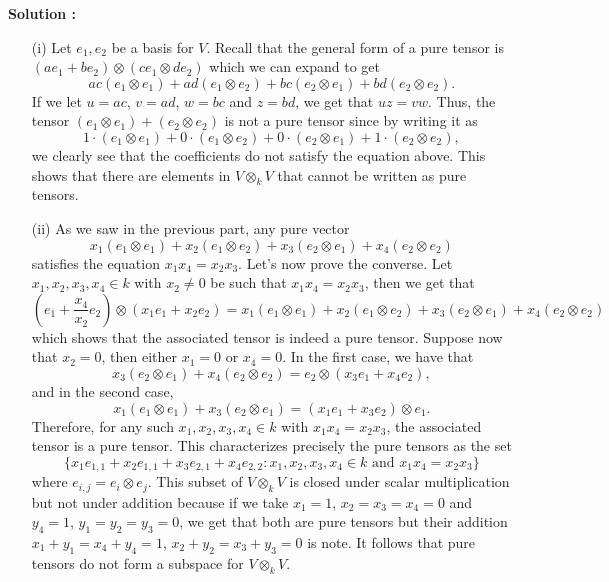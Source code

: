 \documentclass{article}
\begin{document}
\noindent \textbf{Solution :}
\begin{enumerate}
    \item[(i)] Let $e_1, e_2$ be a basis for $V$. Recall that the general form of a pure tensor is $(ae_1 + be_2)\otimes (ce_1 \otimes de_2)$ which we can expand to get
    $$ac (e_1 \otimes e_1) + ad(e_1 \otimes e_2) + bc(e_2 \otimes e_1) + bd(e_2 \otimes e_2).$$ 
    If we let $u = ac$, $v = ad$, $w = bc$ and $z = bd$, we get that $uz = vw$. Thus, the tensor $(e_1 \otimes e_1) + (e_2 \otimes e_2)$ is not a pure tensor since by writing it as
    $$1\cdot (e_1 \otimes e_1) + 0\cdot(e_1 \otimes e_2) + 0 \cdot (e_2 \otimes e_1) + 1 \cdot (e_2 \otimes e_2),$$
    we clearly see that the coefficients do not satisfy the equation above. This shows that there are elements in $V \otimes_k V$ that cannot be written as pure tensors.
    \item[(ii)] As we saw in the previous part, any pure vector
    $$x_1 (e_1 \otimes e_1) + x_2(e_1 \otimes e_2) + x_3 (e_2 \otimes e_1) + x_4 (e_2 \otimes e_2)$$
    satisfies the equation $x_1x_4 = x_2 x_3$. Let's now prove the converse. Let $x_1, x_2, x_3, x_4 \in k$ with $x_2 \neq 0$ be such that $x_1x_4 = x_2 x_3$, then we get that
    $$\left(e_1 + \frac{x_4}{x_2}e_2\right) \otimes (x_1e_1 + x_2 e_2) = x_1 (e_1 \otimes e_1) + x_2(e_1 \otimes e_2) + x_3 (e_2 \otimes e_1) + x_4 (e_2 \otimes e_2)$$
    which shows that the associated tensor is indeed a pure tensor. Suppose now that $x_2 = 0$, then either $x_1 = 0$ or $x_4 = 0$. In the first case, we have that
    $$x_3(e_2\otimes e_1) + x_4 (e_2 \otimes e_2) = e_2 \otimes (x_3 e_1 + x_4 e_2),$$
    and in the second case,
    $$x_1(e_1\otimes e_1) + x_3 (e_2 \otimes e_1) = (x_1e_1 + x_3e_2) \otimes e_1.$$
    Therefore, for any such $x_1, x_2, x_3, x_4 \in k$ with $x_1 x_4 = x_2 x_3$, the associated tensor is a pure tensor. This characterizes precisely the pure tensors as the set
    $$\{x_1e_{1,1} + x_2e_{1,1} + x_3e_{2,1} + x_4e_{2,2} : x_1, x_2, x_3, x_4 \in k \text{ and }x_1x_4 = x_2x_3\}$$
    where $e_{i,j} = e_i \otimes e_j$. This subset of $V \otimes_k V$ is closed under scalar multiplication but not under addition because if we take $x_1 = 1$, $x_2 = x_3 = x_4 = 0$ and $y_4 = 1$, $y_1 = y_2 = y_3 = 0$, we get that both are pure tensors but their addition $x_1 + y_1 = x_4 + y_4 = 1$, $x_2 + y_2 = x_3 + y_3 = 0$ is note. It follows that pure tensors do not form a subspace for $V \otimes_k V$.
\end{enumerate}

\newpage
\end{document}
